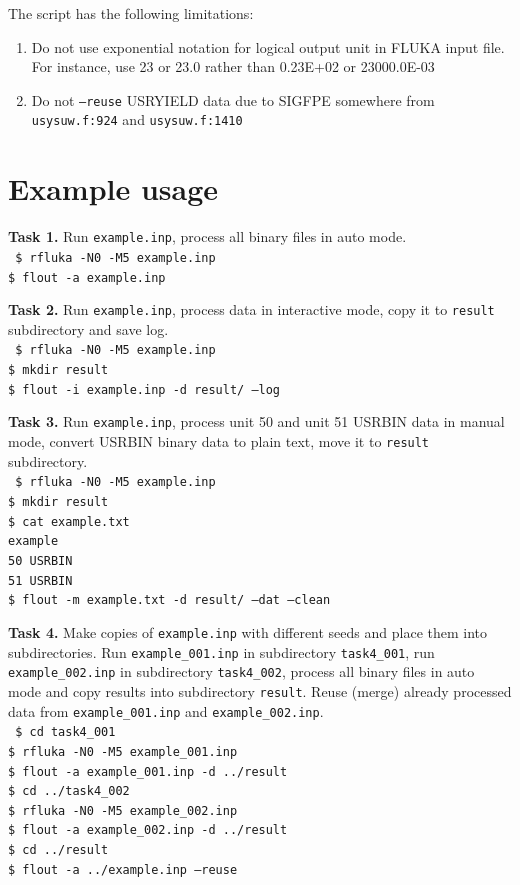 \documentclass{article}
\begin{document}
The script has the following limitations:
\begin{enumerate}
	\item Do not use exponential notation for logical output unit in FLUKA input file.
	For instance, use 23 or 23.0 rather than 0.23E+02 or 23000.0E-03
	\item Do not \texttt{--reuse} USRYIELD data due to SIGFPE somewhere from
	\texttt{usysuw.f:924} and \texttt{usysuw.f:1410}
\end{enumerate}

\section*{Example usage}
\textbf{Task 1.} Run \texttt{example.inp}, process all binary files in auto mode.\\
\texttt{
\$ rfluka -N0 -M5 example.inp\\
\$ flout -a example.inp\\
}

\textbf{Task 2.} Run \texttt{example.inp}, process data in interactive mode,
copy it to \texttt{result} subdirectory and save log.\\
\texttt{
\$ rfluka -N0 -M5 example.inp\\
\$ mkdir result\\
\$ flout -i example.inp -d result/ --log\\
}

\textbf{Task 3.} Run \texttt{example.inp}, process unit 50 and unit 51 USRBIN data in manual mode,
convert USRBIN binary data to plain text, move it to \texttt{result} subdirectory.\\
\texttt{
\$ rfluka -N0 -M5 example.inp\\
\$ mkdir result\\
\$ cat example.txt\\
example\\
50 USRBIN\\
51 USRBIN\\
\$ flout -m example.txt -d result/ --dat --clean\\
}

\textbf{Task 4.} Make copies of \texttt{example.inp} with different seeds
and place them into subdirectories.
Run \texttt{example\_001.inp} in subdirectory \texttt{task4\_001},
run \texttt{example\_002.inp} in subdirectory \texttt{task4\_002},
process all binary files in auto mode and copy results into subdirectory \texttt{result}.
Reuse (merge) already processed data from \texttt{example\_001.inp} and \texttt{example\_002.inp}.\\
\texttt{
\$ cd task4\_001\\
\$ rfluka -N0 -M5 example\_001.inp\\
\$ flout -a example\_001.inp -d ../result\\
\$ cd ../task4\_002\\
\$ rfluka -N0 -M5 example\_002.inp\\
\$ flout -a example\_002.inp -d ../result\\
\$ cd ../result\\
\$ flout -a ../example.inp --reuse\\
}
\end{document}
